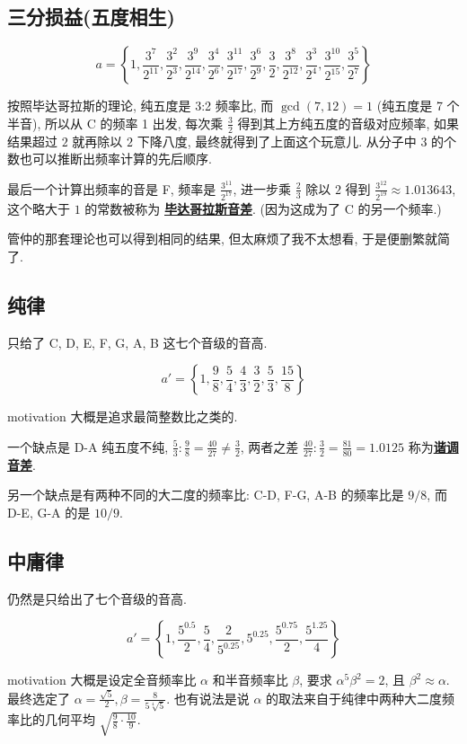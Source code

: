 \documentclass[8pt]{article}
\theoremstyle{compact}
\def\obj#1{\textbf{\uline{#1}}}
\def\C{\textrm{C}}
\begin{document}
\subsection{三分损益(五度相生)}

\def\tt#1#2{\frac{3^{#1}}{2^{#2}}}

$$a = \left\{1, \tt{7}{11}, \tt{2}{3}, \tt{9}{14}, \tt{4}{6}, \tt{11}{17}, \tt{6}{9}, \frac32, \tt{8}{12}, \tt{3}{4}, \tt{10}{15}, \tt{5}{7}\right\}$$

按照毕达哥拉斯的理论, 纯五度是 3:2 频率比, 而 $\gcd(7, 12) = 1$ (纯五度是 7 个半音), 所以从 $\C$ 的频率 1 出发, 每次乘 $\frac32$ 得到其上方纯五度的音级对应频率, 如果结果超过 $2$ 就再除以 $2$ 下降八度, 最终就得到了上面这个玩意儿. 从分子中 $3$ 的个数也可以推断出频率计算的先后顺序.

最后一个计算出频率的音是 F, 频率是 $\tt{11}{17}$, 进一步乘 $\frac23$ 除以 $2$ 得到 $\tt{12}{19} \approx 1.013643$, 这个略大于 $1$ 的常数被称为 \obj{毕达哥拉斯音差}. (因为这成为了 C 的另一个频率.)

管仲的那套理论也可以得到相同的结果, 但太麻烦了我不太想看, 于是便删繁就简了.

\subsection{纯律}
只给了 C, D, E, F, G, A, B 这七个音级的音高.

$$a' = \left\{1, \frac98, \frac54, \frac43, \frac32, \frac53, \frac{15}8\right\}$$

motivation 大概是追求最简整数比之类的.

一个缺点是 D-A 纯五度不纯, $\frac53 : \frac98 = \frac{40}{27} \neq \frac32$, 两者之差 $\frac{40}{27} : \frac32 = \frac{81}{80} = 1.0125$ 称为\obj{谐调音差}.

另一个缺点是有两种不同的大二度的频率比: C-D, F-G, A-B 的频率比是 $9/8$, 而 D-E, G-A 的是 $10/9$.

\subsection{中庸律}

仍然是只给出了七个音级的音高.

$$a' = \left\{ 1, \frac{5^{0.5}}{2}, \frac54, \frac{2}{5^{0.25}}, 5^{0.25}, \frac{5^{0.75}}{2}, \frac{5^{1.25}}{4} \right\}$$

motivation 大概是设定全音频率比 $\alpha$ 和半音频率比 $\beta$, 要求 $\alpha^5\beta^2 = 2$, 且 $\beta^2 \approx \alpha$. 最终选定了 $\alpha = \frac{\sqrt{5}}{2}, \beta = \frac{8}{5\sqrt[4]5}$. 也有说法是说 $\alpha$ 的取法来自于纯律中两种大二度频率比的几何平均 $\sqrt{\frac98 \cdot \frac{10}9}$.
\end{document}
